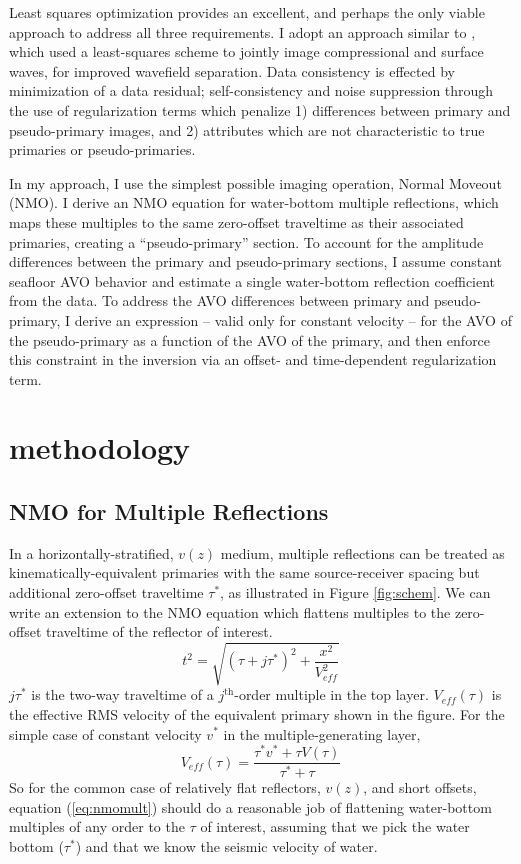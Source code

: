Least squares optimization provides an excellent, and perhaps the only viable approach to 
address all three requirements.  
I adopt an approach similar to , which used a least-squares scheme 
to jointly image compressional and surface waves, for improved wavefield separation.  
Data consistency is effected by minimization of a data residual; self-consistency and noise 
suppression through the use of regularization terms which penalize 1) differences between 
primary and pseudo-primary images, and 2) attributes which are not characteristic to 
true primaries or pseudo-primaries.
\par
In my approach, I use the simplest possible imaging operation, Normal Moveout (NMO).  I 
derive an NMO equation for water-bottom multiple reflections, which maps these multiples
to the same zero-offset traveltime as their associated primaries, creating a ``pseudo-primary''
section.  To account for the amplitude differences between the primary and pseudo-primary
sections, I assume constant seafloor AVO behavior and estimate a single water-bottom 
reflection coefficient from the data.  To address the AVO differences between primary
and pseudo-primary, I derive an expression -- valid only for constant velocity -- for the
AVO of the pseudo-primary as a function of the AVO of the primary, and then enforce
this constraint in the inversion via an offset- and time-dependent regularization term.

\section{methodology}
\subsection{NMO for Multiple Reflections}

In a horizontally-stratified, $v(z)$ medium, multiple reflections can be treated as 
kinematically-equivalent primaries with the same source-receiver spacing but additional 
zero-offset traveltime $\tau^*$, as illustrated in Figure \ref{fig:schem}.  We can write 
an extension to the NMO equation which flattens multiples to the zero-offset traveltime 
of the reflector of interest.
\begin{equation}
	t^2 = \sqrt{ (\tau+j\tau^{*})^2 + \frac{x^2}{V_{eff}^2} }  \label{eq:nmomult}
\end{equation}
$j\tau^{*}$ is the two-way traveltime of a $j^{\mbox{th}}$-order multiple in the
top layer.  $V_{eff}(\tau)$ is the effective RMS velocity of the 
equivalent primary shown in the figure.  For the simple case of constant velocity $v^*$ 
in the multiple-generating layer,
\begin{equation}
	V_{eff}(\tau) = \frac{ \tau^{*} v^{*} + \tau V(\tau) }{ \tau^{*} + \tau } \label{eq:veff}
\end{equation}
So for the common case of relatively flat reflectors, $v(z)$, and short offsets, equation 
(\ref{eq:nmomult}) should do a reasonable job of flattening water-bottom multiples of any 
order to the $\tau$ of interest, assuming that we pick the water bottom ($\tau^{*}$) and 
that we know the seismic velocity of water.

